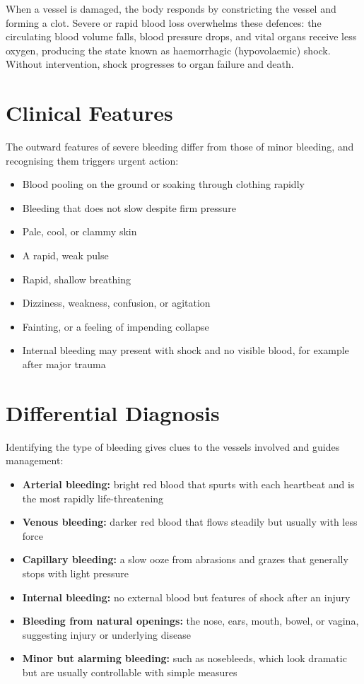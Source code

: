 When a vessel is damaged, the body responds by constricting the vessel and forming a clot. Severe or rapid blood loss overwhelms these defences: the circulating blood volume falls, blood pressure drops, and vital organs receive less oxygen, producing the state known as haemorrhagic (hypovolaemic) shock. Without intervention, shock progresses to organ failure and death.

\section*{Clinical Features}
The outward features of severe bleeding differ from those of minor bleeding, and recognising them triggers urgent action:

\begin{itemize}
    \item Blood pooling on the ground or soaking through clothing rapidly
    \item Bleeding that does not slow despite firm pressure
    \item Pale, cool, or clammy skin
    \item A rapid, weak pulse
    \item Rapid, shallow breathing
    \item Dizziness, weakness, confusion, or agitation
    \item Fainting, or a feeling of impending collapse
    \item Internal bleeding may present with shock and no visible blood, for example after major trauma
\end{itemize}

\section*{Differential Diagnosis}
Identifying the type of bleeding gives clues to the vessels involved and guides management:

\begin{itemize}
    \item \textbf{Arterial bleeding:} bright red blood that spurts with each heartbeat and is the most rapidly life-threatening
    \item \textbf{Venous bleeding:} darker red blood that flows steadily but usually with less force
    \item \textbf{Capillary bleeding:} a slow ooze from abrasions and grazes that generally stops with light pressure
    \item \textbf{Internal bleeding:} no external blood but features of shock after an injury
    \item \textbf{Bleeding from natural openings:} the nose, ears, mouth, bowel, or vagina, suggesting injury or underlying disease
    \item \textbf{Minor but alarming bleeding:} such as nosebleeds, which look dramatic but are usually controllable with simple measures
\end{itemize}

